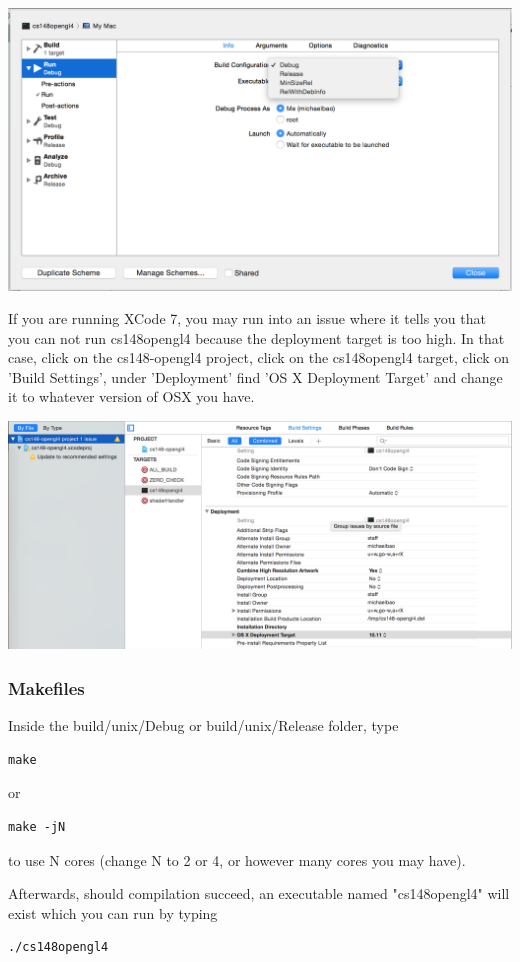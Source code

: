 \documentclass{article}
\begin{document}
\includegraphics[width=\linewidth]{xcode2.png}

If you are running XCode 7, you may run into an issue where it tells you that you can not run cs148opengl4 because the deployment target is too high. In that case, click on the cs148-opengl4 project, click on the cs148opengl4 target, click on 'Build Settings', under 'Deployment' find 'OS X Deployment Target' and change it to whatever version of OSX you have.

\includegraphics[width=\linewidth]{xcode3.png}

\subsubsection*{Makefiles}

Inside the build/unix/Debug or build/unix/Release folder, type

\begin{lstlisting}
make
\end{lstlisting}

or 

\begin{lstlisting}
make -jN
\end{lstlisting}

to use N cores (change N to 2 or 4, or however many cores you may have).

Afterwards, should compilation succeed, an executable named "cs148opengl4" will exist which you can run by typing 

\begin{lstlisting}
./cs148opengl4
\end{lstlisting}
\end{document}
